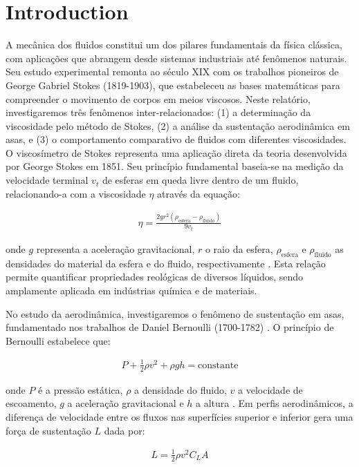 \section{Introduction}
A mecânica dos fluidos constitui um dos pilares fundamentais da física clássica, com aplicações que abrangem desde sistemas industriais até fenômenos naturais. Seu estudo experimental remonta ao século XIX com os trabalhos pioneiros de George Gabriel Stokes (1819-1903)\cite{araujo}, que estabeleceu as bases matemáticas para compreender o movimento de corpos em meios viscosos. Neste relatório, investigaremos três fenômenos inter-relacionados: (1) a determinação da viscosidade pelo método de Stokes, (2) a análise da sustentação aerodinâmica em asas, e (3) o comportamento comparativo de fluidos com diferentes viscosidades.
O viscosímetro de Stokes representa uma aplicação direta da teoria desenvolvida por George Stokes em 1851. Seu princípio fundamental baseia-se na medição da velocidade terminal $v_t$ de esferas em queda livre dentro de um fluido, relacionando-a com a viscosidade $\eta$ através da equação:


\begin{align*}
        \eta = \frac{2 g r^2 (\rho_{\text{esfera}} - \rho_{\text{fluido}})}{9 v_t}
\end{align*}

onde $g$ representa a aceleração gravitacional, $r$ o raio da esfera, $\rho_{\text{esfera}}$ e $\rho_{\text{fluido}}$ as densidades do material da esfera e do fluido, respectivamente \cite{Munson2004-tl}. Esta relação permite quantificar propriedades reológicas de diversos líquidos, sendo amplamente aplicada em indústrias química e de materiais.

No estudo da aerodinâmica, investigaremos o fenômeno de sustentação em asas, fundamentado nos trabalhos de Daniel Bernoulli (1700-1782) \cite{moyses}. O princípio de Bernoulli estabelece que:

\begin{align*}
        P + \frac{1}{2} \rho v^2 + \rho gh = \text{constante}
\end{align*}

onde $P$ é a pressão estática, $\rho$ a densidade do fluido, $v$ a velocidade de escoamento, $g$ a aceleração gravitacional e $h$ a altura \cite{Munson2004-tl}. Em perfis aerodinâmicos, a diferença de velocidade entre os fluxos nas superfícies superior e inferior gera uma força de sustentação $L$ dada por:

\begin{align*}
       L = \frac{1}{2} \rho v^2 C_L A
\end{align*}


